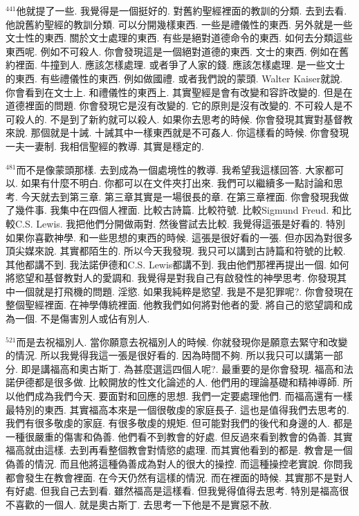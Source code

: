 \documentclass{book}
\begin{document}
$^{441}$他就提了一些.
我覺得是一個挺好的.
對舊約聖經裡面的教訓的分類.
去到去看.
他說舊約聖經的教訓分類.
可以分開幾樣東西.
一些是禮儀性的東西.
另外就是一些文士性的東西.
關於文士處理的東西.
有些是絕對道德命令的東西.
如何去分類這些東西呢.
例如不可殺人.
你會發現這是一個絕對道德的東西.
文士的東西.
例如在舊約裡面.
牛撞到人.
應該怎樣處理.
或者爭了人家的錢.
應該怎樣處理.
是一些文士的東西.
有些禮儀性的東西.
例如做國禮.
或者我們說的蒙頭.
Walter Kaiser就說.
你會看到在文士上.
和禮儀性的東西上.
其實聖經是會有改變和容許改變的.
但是在道德裡面的問題.
你會發現它是沒有改變的.
它的原則是沒有改變的.
不可殺人是不可殺人的.
不是到了新約就可以殺人.
如果你去思考的時候.
你會發現其實對基督教來說.
那個就是十誡.
十誡其中一樣東西就是不可姦人.
你這樣看的時候.
你會發現一夫一妻制.
我相信聖經的教導.
其實是穩定的.

$^{481}$而不是像蒙頭那樣.
去到成為一個處境性的教導.
我希望我這樣回答.
大家都可以.
如果有什麼不明白.
你都可以在文件夾打出來.
我們可以繼續多一點討論和思考.
今天就去到第三章.
第三章其實是一場很長的章.
在第三章裡面.
你會發現我做了幾件事.
我集中在四個人裡面.
比較古詩篇.
比較符號.
比較Sigmund Freud.
和比較C.S. Lewis.
我把他們分開做兩對.
然後嘗試去比較.
我覺得這張是好看的.
特別如果你喜歡神學.
和一些思想的東西的時候.
這張是很好看的一張.
但亦因為對很多頂尖媒來說.
其實都陌生的.
所以今天我發現.
我只可以講到古詩篇和符號的比較.
其他都講不到.
我法諾伊德和C.S. Lewis都講不到.
我由他們那裡再提出一個.
如何將慾望和基督教對人的愛調和.
我覺得是對我自己有啟發性的神學思考.
你發現其中一個就是打飛機的問題.
淫慾.
如果我純粹是慾望.
我是不是犯罪呢?.
你會發現在整個聖經裡面.
在神學傳統裡面.
他教我們如何將對他者的愛.
將自己的慾望調和成為一個.
不是傷害別人或佔有別人.

$^{521}$而是去祝福別人.
當你願意去祝福別人的時候.
你就發現你是願意去緊守和改變的情況.
所以我覺得我這一張是很好看的.
因為時間不夠.
所以我只可以講第一部分.
即是講福高和奧古斯丁.
為甚麼選這四個人呢?.
最重要的是你會發現.
福高和法諾伊德都是很多做.
比較開放的性文化論述的人.
他們用的理論基礎和精神導師.
所以他們成為我們今天.
要面對和回應的思想.
我們一定要處理他們.
而福高還有一樣最特別的東西.
其實福高本來是一個很敬虔的家庭長子.
這也是值得我們去思考的.
我們有很多敬虔的家庭.
有很多敬虔的規矩.
但可能對我們的後代和身邊的人.
都是一種很嚴重的傷害和偽善.
他們看不到教會的好處.
但反過來看到教會的偽善.
其實福高就由這樣.
去到再看整個教會對情慾的處理.
而其實他看到的都是.
教會是一個偽善的情況.
而且他將這種偽善成為對人的很大的操控.
而這種操控老實說.
你問我都會發生在教會裡面.
在今天仍然有這樣的情況.
而在裡面的時候.
其實那不是對人有好處.
但我自己去到看.
雖然福高是這樣看.
但我覺得值得去思考.
特別是福高很不喜歡的一個人.
就是奧古斯丁.
去思考一下他是不是實惡不赦.
\end{document}
